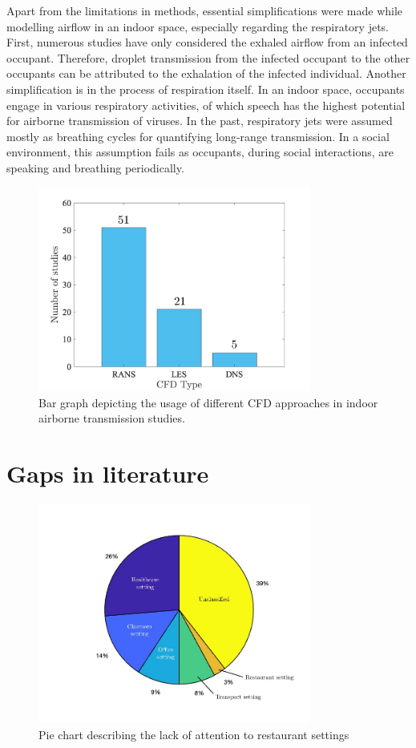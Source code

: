 \documentclass[preprint,12pt]{elsarticle}
\begin{document}
Apart from the limitations in methods, essential simplifications were made while modelling airflow in an indoor space, especially regarding the respiratory jets. First, numerous studies have only considered the exhaled airflow from an infected occupant. Therefore, droplet transmission from the infected occupant to the other occupants can be attributed to the exhalation of the infected individual. Another simplification is in the process of respiration itself. In an indoor space, occupants engage in various respiratory activities, of which speech has the highest potential for airborne transmission of viruses. In the past, respiratory jets were assumed mostly as breathing cycles for quantifying long-range transmission. In a social environment, this assumption fails as occupants, during social interactions, are speaking and breathing periodically.

\begin{figure}[ht]
    \centering
    \includegraphics[width=0.8\textwidth]{figures/cfd.jpg}
    \caption{Bar graph depicting the usage of different CFD approaches in indoor airborne transmission studies.}
    \label{fig:cfd}
\end{figure}

\section{Gaps in literature}

\begin{figure}[ht]
    \centering
    \includegraphics[width=0.8\textwidth]{figures/pie.jpg}
    \caption{Pie chart describing the lack of attention to restaurant settings}
    \label{fig:pie}
\end{figure}
\end{document}
